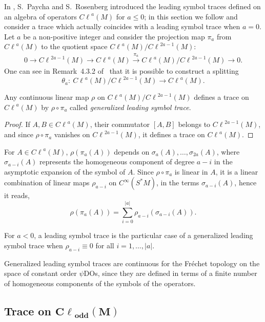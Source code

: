 \documentclass[pdftex]{sigma}
\DeclareMathOperator{\odd}{odd} \DeclareMathOperator{\supp}{supp}
\def \Cl {{C\ell}}
\begin{document}
In \cite{rosenberg}, S.~Paycha and S.~Rosenberg introduced the leading symbol traces def\/ined on an algebra of operators $\Cl^{a}(M)$ for $a\leq0$; in this section we follow \cite{neirathesis} and consider a trace which actually coincides with a leading symbol trace when $a=0$. Let $a$ be a non-positive integer and consider the projection map $\pi_a$ from $\Cl^{a}(M)$ to the quotient space $\Cl^{a}(M)/\Cl^{2a-1}(M)$:
\begin{gather}
0\to \Cl^{2a-1}(M)\to \Cl^{a}(M)\overset{\pi_a}{\rightarrow}\Cl^{a}(M)/\Cl^{2a-1}(M)\to0. \label{ses1}
\end{gather}
One can see in Remark~4.3.2 of~\cite{neirathesis} that it is possible to construct a splitting
\[
\theta_a: \ \Cl^{a}(M)/\Cl^{2a-1}(M)\to \Cl^{a}(M).
\]

\begin{lemma}
Any continuous linear map $\rho$ on $\Cl^{a}(M)/\Cl^{2a-1}(M)$ defines a trace on $\Cl^{a}(M)$ by $\rho\circ\pi_a$ called \emph{generalized leading symbol trace}.
\end{lemma}

\begin{proof}
If $A, B\in \Cl^{a}(M)$, their commutator $[A,B]$ belongs to $\Cl^{2a-1}(M)$, and since $\rho\circ\pi_a$ vanishes on $\Cl^{2a-1}(M)$, it def\/ines a trace on $\Cl^{a}(M)$.\end{proof}

 For $A\in \Cl^{a}(M)$, $\rho(\pi_a(A))$ depends on $\sigma_a(A),\ldots,\sigma_{2a}(A)$, where $\sigma_{a-i}(A)$ represents the homogeneous component of degree $a-i$ in the asymptotic expansion of the symbol of $A$. Since $\rho\circ\pi_a$ is linear in $A$, it is a linear combination of linear maps $\rho_{a-i}$ on $C^\infty(S^*M)$, in the terms $\sigma_{a-i}(A)$, hence it reads,
\[
\rho(\pi_a(A))=\sum_{i=0}^{|a|}\rho_{a-i}(\sigma_{a-i}(A)).
\]

\begin{remark}
For $a<0$, a leading symbol trace is the particular case of a generalized leading symbol trace when $\rho_{a-i}\equiv0$ for all $i=1,\ldots,|a|$.
\end{remark}

Generalized leading symbol traces are continuous for the Fr\'echet topology on the space of constant order $\psi$DOs, since they are def\/ined in terms of a f\/inite number of homogeneous components of the symbols of the operators.

\subsection[Trace on $\Cl_{\odd}(M)$]{Trace on $\boldsymbol{\Cl_{\odd}(M)}$}
\end{document}
